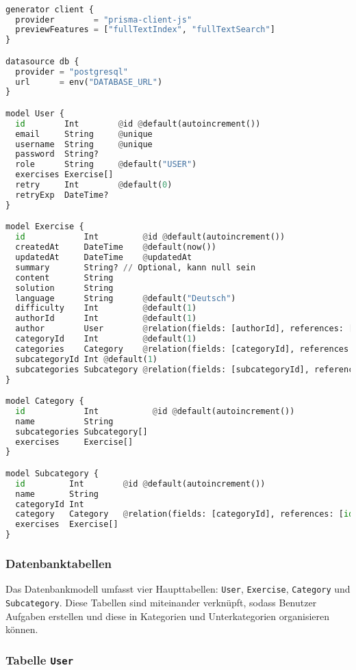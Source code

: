 \documentclass[12pt,a4paper]{article} %
\begin{document}
\begin{lstlisting}[language=Python]

generator client {
  provider        = "prisma-client-js"
  previewFeatures = ["fullTextIndex", "fullTextSearch"]
}

datasource db {
  provider = "postgresql"
  url      = env("DATABASE_URL")
}

model User {
  id        Int        @id @default(autoincrement())
  email     String     @unique
  username  String     @unique 
  password  String?
  role      String     @default("USER")
  exercises Exercise[]
  retry     Int        @default(0)
  retryExp  DateTime?  
}

model Exercise {
  id            Int         @id @default(autoincrement())
  createdAt     DateTime    @default(now())
  updatedAt     DateTime    @updatedAt
  summary       String? // Optional, kann null sein
  content       String
  solution      String
  language      String      @default("Deutsch")
  difficulty    Int         @default(1)
  authorId      Int         @default(1)
  author        User        @relation(fields: [authorId], references: [id])
  categoryId    Int         @default(1)
  categories    Category    @relation(fields: [categoryId], references: [id])
  subcategoryId Int @default(1)
  subcategories Subcategory @relation(fields: [subcategoryId], references: [id])
}

model Category {
  id            Int           @id @default(autoincrement())
  name          String
  subcategories Subcategory[]
  exercises     Exercise[]
}

model Subcategory {
  id         Int        @id @default(autoincrement())
  name       String
  categoryId Int
  category   Category   @relation(fields: [categoryId], references: [id], onDelete: Cascade)
  exercises  Exercise[]
}

\end{lstlisting}


\subsubsection{Datenbanktabellen}

Das Datenbankmodell umfasst vier Haupttabellen: \texttt{User}, \texttt{Exercise}, \texttt{Category} und \texttt{Subcategory}. Diese Tabellen sind miteinander verknüpft, sodass Benutzer Aufgaben erstellen und diese in Kategorien und Unterkategorien organisieren können.

\subsubsection{Tabelle \texttt{User}}
\end{document}
